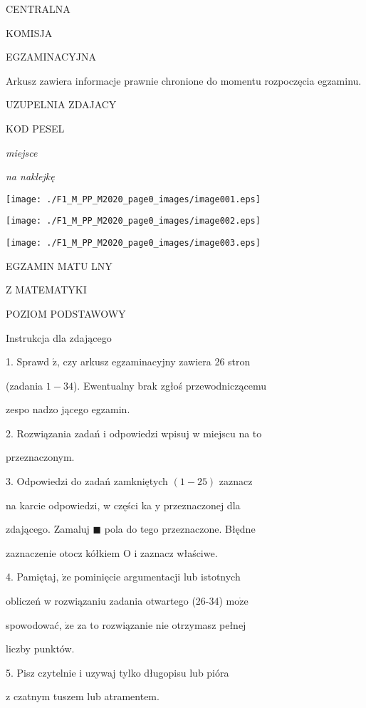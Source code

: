\documentclass[a4paper,12pt]{article}
\begin{document}
CENTRALNA

KOMISJA

EGZAMINACYJNA

Arkusz zawiera informacje prawnie chronione do momentu rozpoczęcia egzaminu.

UZUPELNIA ZDAJACY

KOD PESEL

{\it miejsce}

{\it na naklejkę}
\begin{center}
\texttt{[image: ./F1\_M\_PP\_M2020\_page0\_images/image001.eps]}

\texttt{[image: ./F1\_M\_PP\_M2020\_page0\_images/image002.eps]}

\texttt{[image: ./F1\_M\_PP\_M2020\_page0\_images/image003.eps]}
\end{center}
EGZAMIN MATU LNY

Z MATEMATYKI

POZIOM PODSTAWOWY

Instrukcja dla zdającego

1. Sprawd $\acute{\mathrm{z}}$, czy arkusz egzaminacyjny zawiera 26 stron

(zadania $1-34$). Ewentualny brak zgłoś przewodniczącemu

zespo nadzo jącego egzamin.

2. Rozwiązania zadań i odpowiedzi wpisuj w miejscu na to

przeznaczonym.

3. Odpowiedzi do zadań zamkniętych $(1-25)$ zaznacz

na karcie odpowiedzi, w części ka $\mathrm{y}$ przeznaczonej dla

zdającego. Zamaluj $\blacksquare$ pola do tego przeznaczone. Błędne

zaznaczenie otocz kółkiem $\mathrm{O}$ i zaznacz właściwe.

4. Pamiętaj, $\dot{\mathrm{z}}\mathrm{e}$ pominięcie argumentacji lub istotnych

obliczeń w rozwiązaniu zadania otwartego (26-34) $\mathrm{m}\mathrm{o}\dot{\mathrm{z}}\mathrm{e}$

spowodować, $\dot{\mathrm{z}}\mathrm{e}$ za to rozwiązanie nie otrzymasz pełnej

liczby punktów.

5. Pisz czytelnie i uzywaj tylko długopisu lub pióra

z czatnym tuszem lub atramentem.
\end{document}
